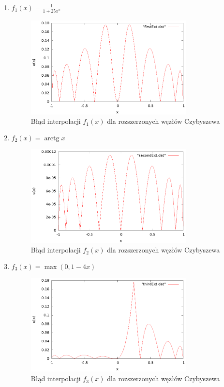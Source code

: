 \documentclass{article}
\DeclareMathOperator{\arctg}{arctg}
\begin{document}
\begin{enumerate}
\item $f_1(x) = \frac{1}{1 + 25x^2}$\\
\begin{figure}[H]
    \centering
    \includegraphics[width=0.8\textwidth]{wykresy/firstExt.eps}
    \caption{Błąd interpolacji $f_1(x)$ dla rozszerzonych węzłów Czybyszewa}
\end{figure}
\item $f_2(x) = \arctg x$ \\
\begin{figure}[H]
    \centering
    \includegraphics[width=0.8\textwidth]{wykresy/secondExt.eps}
    \caption{Błąd interpolacji $f_2(x)$ dla rozszerzonych węzłów Czybyszewa}
\end{figure}
\item $f_3(x) = \max(0, 1 - 4x)$\\
\begin{figure}[H]
    \centering
    \includegraphics[width=0.8\textwidth]{wykresy/thirdExt.eps}
    \caption{Błąd interpolacji $f_3(x)$ dla rozszerzonych węzłów Czybyszewa}
\end{figure}
\end{enumerate}
\end{document}
